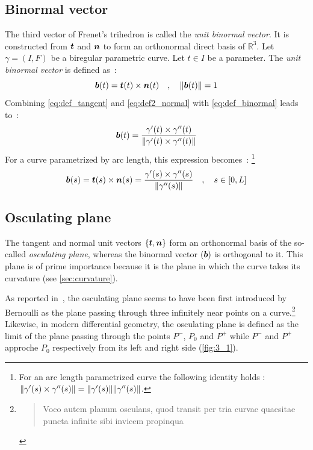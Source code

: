\subsection{Binormal vector}
The third vector of Frenet's trihedron is called the \emph{unit binormal vector}. It is constructed from $\boldsymbol{t}$ and $\boldsymbol{n}$ to form an orthonormal direct basis of $\mathbb{R}^{3}$. 
Let $\gamma = (I,F)$ be a biregular parametric curve. Let $t \in I$ be a parameter. The \emph{unit binormal vector} is defined as~:
\begin{equation}
	\boldsymbol{b}(t) = \boldsymbol{t}(t) \times \boldsymbol{n}(t)
	\quad,\quad
	\lVert\boldsymbol{b}(t)\rVert=1
	\label{eq:def_binormal}
\end{equation}
Combining \cref{eq:def_tangent} and \cref{eq:def2_normal} with \cref{eq:def_binormal} leads to~:
\begin{equation}
	\boldsymbol{b}(t) = \frac{\gamma'(t) \times \gamma''(t)}{\lVert\gamma'(t) \times \gamma''(t)\rVert}
\end{equation}
For a curve parametrized by arc length, this expression becomes~: \footnote{For an arc length parametrized curve the following identity holds : $\lVert\gamma'(s) \times \gamma''(s)\rVert = \lVert\gamma'(s)\rVert \lVert\gamma''(s)\rVert$.}
\begin{equation}
	\boldsymbol{b}(s) = \boldsymbol{t}(s) \times \boldsymbol{n}(s)
	= \frac{\gamma'(s) \times \gamma''(s)}{\lVert\gamma''(s)\rVert}
	\quad,\quad
	s \in [0,L]
\end{equation}

\subsection{Osculating plane}\label{sec:osculatingplane}
The tangent and normal unit vectors $\{\boldsymbol{t},\boldsymbol{n}\}$ form an orthonormal basis of the so-called \emph{osculating plane}, whereas the binormal vector $(\boldsymbol{b})$ is orthogonal to it. This plane is of prime importance because it is the plane in which the curve takes its curvature (see \cref{sec:curvature}).

As reported in~\cite[p.45]{Delcourt2007}, the osculating plane seems to have been first introduced by Bernoulli as the plane passing through three infinitely near points on a curve.\footnote{\blockcquote[p.113]{Bernoulli1728}{Voco autem planum osculans, quod transit per tria curvae quaesitae puncta infinite sibi invicem propinqua}.
} Likewise, in modern differential geometry, the osculating plane is defined as the limit of the plane passing through the points $P^-$, $P_0$ and $P^+$ while $P^-$ and $P^+$ approche $P_0$ respectively from its left and right side (\cref{fig:3_1}).

